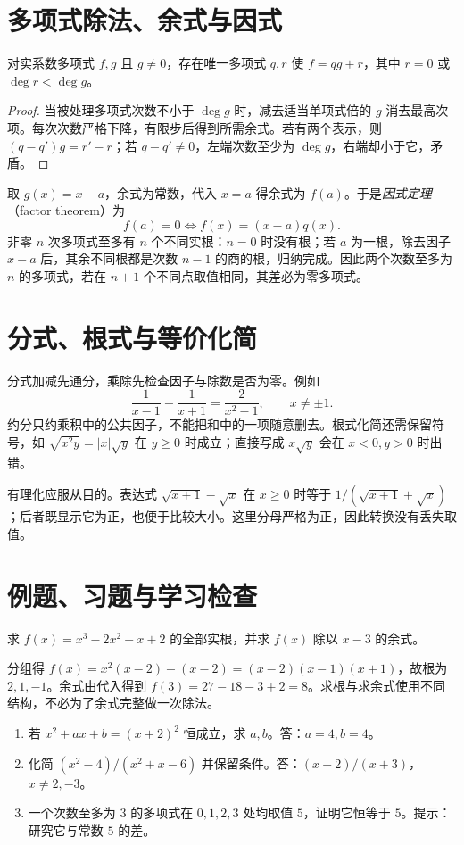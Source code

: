\section{多项式除法、余式与因式}
\begin{theorem}[多项式带余除法]
对实系数多项式 $f,g$ 且 $g\ne0$，存在唯一多项式 $q,r$ 使 $f=qg+r$，其中 $r=0$ 或 $\deg r<\deg g$。
\end{theorem}
\begin{proof}
当被处理多项式次数不小于 $\deg g$ 时，减去适当单项式倍的 $g$ 消去最高次项。每次次数严格下降，有限步后得到所需余式。若有两个表示，则 $(q-q')g=r'-r$；若 $q-q'\ne0$，左端次数至少为 $\deg g$，右端却小于它，矛盾。
\end{proof}
取 $g(x)=x-a$，余式为常数，代入 $x=a$ 得余式为 $f(a)$。于是\emph{因式定理}（factor theorem）为
\begin{equation}\label{eq:em-factor}
 f(a)=0\Longleftrightarrow f(x)=(x-a)q(x).
\end{equation}
非零 $n$ 次多项式至多有 $n$ 个不同实根：$n=0$ 时没有根；若 $a$ 为一根，除去因子 $x-a$ 后，其余不同根都是次数 $n-1$ 的商的根，归纳完成。因此两个次数至多为 $n$ 的多项式，若在 $n+1$ 个不同点取值相同，其差必为零多项式。

\section{分式、根式与等价化简}
分式加减先通分，乘除先检查因子与除数是否为零。例如
\[
 \frac1{x-1}-\frac1{x+1}=\frac2{x^2-1},\qquad x\ne\pm1.
\]
约分只约乘积中的公共因子，不能把和中的一项随意删去。根式化简还需保留符号，如 $\sqrt{x^2y}=|x|\sqrt y$ 在 $y\ge0$ 时成立；直接写成 $x\sqrt y$ 会在 $x<0,y>0$ 时出错。

有理化应服从目的。表达式 $\sqrt{x+1}-\sqrt x$ 在 $x\ge0$ 时等于 $1/(\sqrt{x+1}+\sqrt x)$；后者既显示它为正，也便于比较大小。这里分母严格为正，因此转换没有丢失取值。

\section{例题、习题与学习检查}
\begin{example}
求 $f(x)=x^3-2x^2-x+2$ 的全部实根，并求 $f(x)$ 除以 $x-3$ 的余式。
\end{example}
\begin{solve}
分组得 $f(x)=x^2(x-2)-(x-2)=(x-2)(x-1)(x+1)$，故根为 $2,1,-1$。余式由代入得到 $f(3)=27-18-3+2=8$。求根与求余式使用不同结构，不必为了余式完整做一次除法。
\end{solve}
\begin{enumerate}
\item 若 $x^2+ax+b=(x+2)^2$ 恒成立，求 $a,b$。答：$a=4,b=4$。
\item 化简 $(x^2-4)/(x^2+x-6)$ 并保留条件。答：$(x+2)/(x+3)$，$x\ne2,-3$。
\item 一个次数至多为 $3$ 的多项式在 $0,1,2,3$ 处均取值 $5$，证明它恒等于 $5$。提示：研究它与常数 $5$ 的差。
\end{enumerate}

